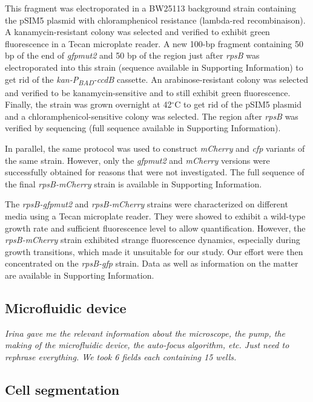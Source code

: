 This fragment was electroporated in a BW25113 background strain containing the pSIM5 plasmid with chloramphenicol resistance (lambda-red recombinaison).
A kanamycin-resistant colony was selected and verified to exhibit green fluorescence in a Tecan microplate reader.
A new 100-bp fragment containing 50 bp of the end of \textit{gfpmut2} and 50 bp of the region just after \textit{rpsB} was electroporated into this strain (sequence available in Supporting Information) to get rid of the \textit{kan-P\textsubscript{BAD}-ccdB} cassette.
An arabinose-resistant colony was selected and verified to be kanamycin-sensitive and to still exhibit green fluorescence.
Finally, the strain was grown overnight at 42$^\circ$C to get rid of the pSIM5 plasmid and a chloramphenicol-sensitive colony was selected.
The region after \textit{rpsB} was verified by sequencing (full sequence available in Supporting Information).

In parallel, the same protocol was used to construct \textit{mCherry} and \textit{cfp} variants of the same strain.
However, only the \textit{gfpmut2} and \textit{mCherry} versions were successfully obtained for reasons that were not investigated.
The full sequence of the final \textit{rpsB-mCherry} strain is available in Supporting Information.

The \textit{rpsB-gfpmut2} and \textit{rpsB-mCherry} strains were characterized on different media using a Tecan microplate reader.
They were showed to exhibit a wild-type growth rate and sufficient fluorescence level to allow quantification.
However, the \textit{rpsB-mCherry} strain exhibited strange fluorescence dynamics, especially during growth transitions, which made it unsuitable for our study.
Our effort were then concentrated on the \textit{rpsB-gfp} strain.
Data as well as information on the matter are available in Supporting Information.

\subsection{Microfluidic device}

\textit{Irina gave me the relevant information about the microscope, the pump, the making of the microfluidic device, the auto-focus algorithm, etc.
Just need to rephrase everything.
We took 6 fields each containing 15 wells.}

\subsection{Cell segmentation}


